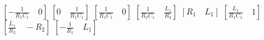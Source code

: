 $[-\frac{1}{R_1 C_1}\quad 0]$
$[0\quad \frac{1}{R_1 C_1}]$
$[\frac{1}{R_1 C_1}\quad 0]$
$[\frac{1}{R_2 C_1} \quad \frac{L_1}{R_2}]$
$[R_1\quad L_1]$
$[\frac{L_1}{R_1 C_1} \quad 1]$
$[\frac{L_1}{R_2}\quad -R_2]$
$[-\frac{1}{R_1}\quad L_1]$
